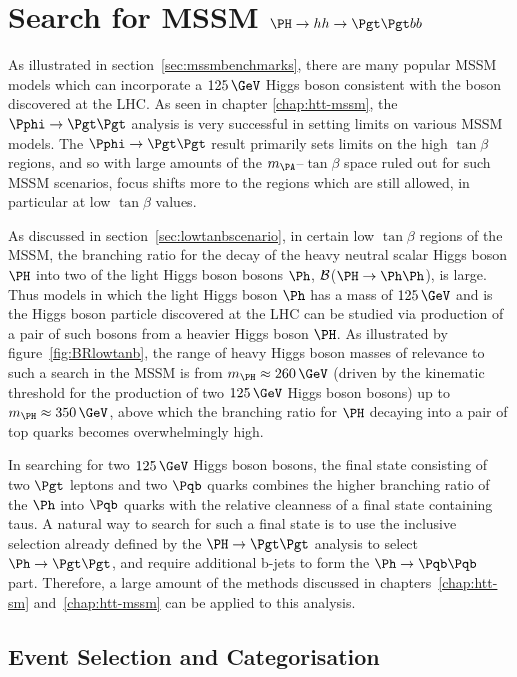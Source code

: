\chapter{Search for MSSM $\PH \to hh \to \Pgt\Pgt bb$}
\label{chap:Hhh}

As illustrated in section~\ref{sec:mssmbenchmarks}, there are many popular
\ac{MSSM} models which can incorporate a $125\,\GeV$ Higgs boson consistent with the boson
discovered at the LHC. As seen in chapter \ref{chap:htt-mssm}, the 
$\Pphi \to \Pgt\Pgt$ analysis is very successful in 
setting limits on various \ac{MSSM} models. The $\Pphi \to \Pgt \Pgt$ result primarily sets
limits on the high $\tan\beta$ regions, and so with large amounts of the
$m_{\PA}$--$\tan\beta$ space ruled out for such \ac{MSSM} scenarios, focus shifts more 
to the regions which are still allowed, in particular at low $\tan\beta$ values.

As discussed in section~\ref{sec:lowtanbscenario}, in certain low $\tan\beta$ regions 
of the \ac{MSSM}, the branching ratio for the
decay of the heavy neutral scalar Higgs boson $\PH$ into two of the light Higgs boson
bosons $\Ph$, $\cal{B}$($\PH \to \Ph\Ph$), is large. Thus models in which the
light Higgs boson $\Ph$ has a mass of $125\,\GeV$ and is the Higgs boson particle discovered at the
LHC can be studied via production of a pair of such bosons from a
heavier Higgs boson $\PH$. As illustrated by figure~\ref{fig:BRlowtanb}, the range of heavy 
Higgs boson masses of relevance to such a search in the \ac{MSSM} is from $m_{\PH}\approx260\,\GeV$ 
(driven by the kinematic threshold for the production of two $125\,\GeV$ Higgs boson
bosons) up to $m_{\PH}\approx350\,\GeV$, above which the branching ratio for 
$\PH$ decaying into a pair of top quarks becomes overwhelmingly high.

In searching for two $125\,\GeV$ Higgs boson bosons, the final state consisting of two
$\Pgt$ leptons and two $\Pqb$ quarks combines the higher branching ratio of the
$\Ph$ into $\Pqb$ quarks with the relative cleanness of a final state containing
taus. A natural way to search for such a final state is to use the inclusive
selection already defined by the $\PH\to\Pgt\Pgt$ analysis to select $\Ph\to\Pgt\Pgt$, 
and require additional b-jets to form the $\Ph\to\Pqb\Pqb$ part. 
Therefore, a large amount of the methods discussed in chapters~\ref{chap:htt-sm} 
and~\ref{chap:htt-mssm} can be applied to this analysis.

\section{Event Selection and Categorisation}
\label{sec:HhhEventSelection}


